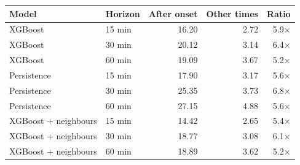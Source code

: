 \begin{tabular}{@{}llrrr@{}}
\toprule
Model & Horizon & After onset & Other times & Ratio \\
\midrule
XGBoost & 15 min & 16.20 & 2.72 & 5.9$\times$ \\
XGBoost & 30 min & 20.12 & 3.14 & 6.4$\times$ \\
XGBoost & 60 min & 19.09 & 3.67 & 5.2$\times$ \\
Persistence & 15 min & 17.90 & 3.17 & 5.6$\times$ \\
Persistence & 30 min & 25.35 & 3.73 & 6.8$\times$ \\
Persistence & 60 min & 27.15 & 4.88 & 5.6$\times$ \\
XGBoost + neighbours & 15 min & 14.42 & 2.65 & 5.4$\times$ \\
XGBoost + neighbours & 30 min & 18.77 & 3.08 & 6.1$\times$ \\
XGBoost + neighbours & 60 min & 18.89 & 3.62 & 5.2$\times$ \\
\bottomrule
\end{tabular}
